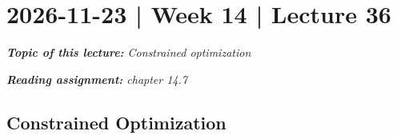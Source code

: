 \documentclass[10pt]{article}
\theoremstyle{definition}
\newtheorem{example}[theorem]{Example}
\renewenvironment{example}
{\begin{oldexample}}
  {\par\smallskip\hfill   End of Example~\theexample. $\square$    \par\end{oldexample}}
\newcommand{\1}[1]{\textbf{1}_{\left[#1\right]}} %
\begin{document}

\newpage
\section{2026-11-23 | Week 14 | Lecture 36}

\begin{center}
  \begin{tcolorbox}[width=0.9\textwidth, colback=white, colframe=black]
    \textit{\textbf{Topic of this lecture:} Constrained optimization}

    \textit{\textbf{Reading assignment:} chapter 14.7}
  \end{tcolorbox}
\end{center}
\subsection{Constrained Optimization}
\end{document}
